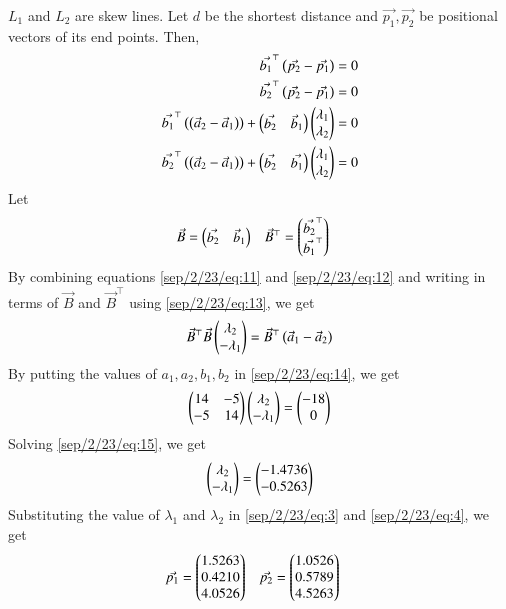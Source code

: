 $L_{1}$ and $L_{2}$ are skew lines.  Let $d$ be the shortest distance and $\Vec{p_{1}}, \Vec{p_{2}}$ be positional vectors of its end points.  Then, 
\begin{align}
    \label{sep/2/23/eq:9}
    \Vec{b_{1}}^\top\left(\Vec{p_{2}}-\Vec{p_{1}}\right)=0\\
    \label{sep/2/23/eq:10}
     \Vec{b_{2}}^\top\left(\Vec{p_{2}}-\Vec{p_{1}}\right)=0\\
     \label{sep/2/23/eq:11}
     \Vec{b_{1}}^\top\left(\left(\Vec{a}_{2} - \Vec{a}_{1}\right)\right)+\begin{pmatrix}\Vec{b_{2}} & \Vec{b}_{1}\end{pmatrix}\begin{pmatrix}\lambda_{1} \\ \lambda_{2}\end{pmatrix}=0\\
     \label{sep/2/23/eq:12}
     \Vec{b_{2}}^\top\left(\left(\Vec{a}_{2} - \Vec{a}_{1}\right)\right)+\begin{pmatrix}\Vec{b_{2}} & \Vec{b_{1}}\end{pmatrix}\begin{pmatrix}\lambda_{1} \\ \lambda_{2}\end{pmatrix}=0
\end{align}
Let 
\begin{align}
\label{sep/2/23/eq:13}
    \Vec{B}&=\begin{pmatrix}\Vec{b_{2}} & \Vec{b}_{1}\end{pmatrix} & \Vec{B}^\top&=\begin{pmatrix}\Vec{b_{2}}^\top \\ \Vec{b_{1}}^\top\end{pmatrix}
\end{align}
By combining equations \eqref{sep/2/23/eq:11} and \eqref{sep/2/23/eq:12} and writing in terms of $\Vec{B}$ and $\Vec{B}^\top$ using \eqref{sep/2/23/eq:13}, we get
\begin{align}
    \label{sep/2/23/eq:14}
    \Vec{B}^\top\Vec{B}\begin{pmatrix}\lambda_{2} \\ -\lambda_{1}\end{pmatrix}= \Vec{B}^\top\left(\Vec{a}_{1} - \Vec{a}_{2}\right)
\end{align}
By putting the values of $a_{1},a_{2},b_{1},b_{2}$ in \eqref{sep/2/23/eq:14}, we get
\begin{align}
    \label{sep/2/23/eq:15}
    \begin{pmatrix}14 & -5 \\ -5 & 14\end{pmatrix}\begin{pmatrix}\lambda_{2} \\ -\lambda_{1}\end{pmatrix}=\begin{pmatrix}-18 \\ 0\end{pmatrix}
\end{align}
Solving \eqref{sep/2/23/eq:15}, we get
\begin{align}
    \label{sep/2/23/eq:16}
    \begin{pmatrix}\lambda_{2} \\ -\lambda_{1}\end{pmatrix}=\begin{pmatrix}-1.4736 \\ -0.5263\end{pmatrix}
\end{align}
Substituting the value of $\lambda_{1}$ and $\lambda_{2}$ in \eqref{sep/2/23/eq:3} and \eqref{sep/2/23/eq:4}, we get
\begin{align}
    \label{sep/2/23/eq:17}
    \Vec{p_{1}} &= \begin{pmatrix}1.5263\\ 0.4210 \\ 4.0526 \end{pmatrix}   &    \Vec{p_{2}}&=\begin{pmatrix} 1.0526\\0.5789\\4.5263\end{pmatrix}
\end{align}
